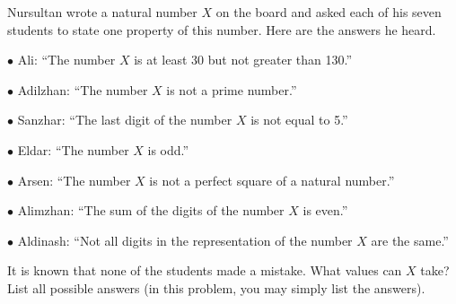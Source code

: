 Nursultan wrote a natural number $X$ on the board and asked each of his seven students to state one property of this number. Here are the answers he heard.

$\bullet$ Ali: ``The number $X$ is at least 30 but not greater than 130.''

$\bullet$ Adilzhan: ``The number $X$ is not a prime number.''

$\bullet$ Sanzhar: ``The last digit of the number $X$ is not equal to 5.''

$\bullet$ Eldar: ``The number $X$ is odd.''

$\bullet$ Arsen: ``The number $X$ is not a perfect square of a natural number.''

$\bullet$ Alimzhan: ``The sum of the digits of the number $X$ is even.''

$\bullet$ Aldinash: ``Not all digits in the representation of the number $X$ are the same.''

It is known that none of the students made a mistake. What values can $X$ take? List all possible answers (in this problem, you may simply list the answers).

